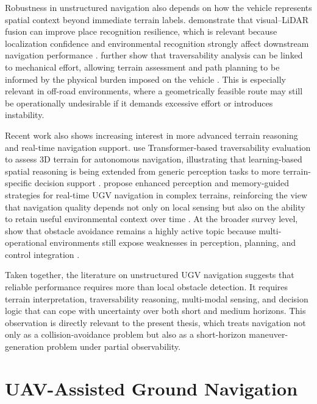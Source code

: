 Robustness in unstructured navigation also depends on how the vehicle represents spatial context beyond immediate terrain labels. \citeauthor{liang2025bdfusion} demonstrate that visual--LiDAR fusion can improve place recognition resilience, which is relevant because localization confidence and environmental recognition strongly affect downstream navigation performance \citep{liang2025bdfusion}. \citeauthor{carvalho2024traversability} further show that traversability analysis can be linked to mechanical effort, allowing terrain assessment and path planning to be informed by the physical burden imposed on the vehicle \citep{carvalho2024traversability}. This is especially relevant in off-road environments, where a geometrically feasible route may still be operationally undesirable if it demands excessive effort or introduces instability.

Recent work also shows increasing interest in more advanced terrain reasoning and real-time navigation support. \citeauthor{wang2024tetr} use Transformer-based traversability evaluation to assess 3D terrain for autonomous navigation, illustrating that learning-based spatial reasoning is being extended from generic perception tasks to more terrain-specific decision support \citep{wang2024tetr}. \citeauthor{han2025realtime} propose enhanced perception and memory-guided strategies for real-time UGV navigation in complex terrains, reinforcing the view that navigation quality depends not only on local sensing but also on the ability to retain useful environmental context over time \citep{han2025realtime}. At the broader survey level, \citeauthor{chen2026obstacle} show that obstacle avoidance remains a highly active topic because multi-operational environments still expose weaknesses in perception, planning, and control integration \citep{chen2026obstacle}.

Taken together, the literature on unstructured UGV navigation suggests that reliable performance requires more than local obstacle detection. It requires terrain interpretation, traversability reasoning, multi-modal sensing, and decision logic that can cope with uncertainty over both short and medium horizons. This observation is directly relevant to the present thesis, which treats navigation not only as a collision-avoidance problem but also as a short-horizon maneuver-generation problem under partial observability.

\section{UAV-Assisted Ground Navigation}

